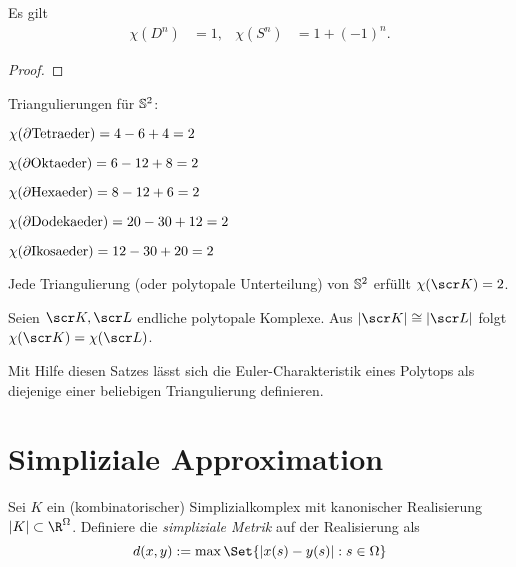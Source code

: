 \begin{prop}
	Es gilt
	\begin{align*}
		\chi(D^n) &= 1, &
		\chi(S^n) &= 1 + (-1)^n.
	\end{align*}
	\begin{proof}
	\end{proof}
\end{prop}

\begin{ex}
	Triangulierungen für $\S^2$:
	\begin{description}
		\item
			$\chi(\boundary \text{Tetraeder}) = 4 - 6 + 4 = 2$
		\item
			$\chi(\boundary \text{Oktaeder}) = 6 - 12 + 8 = 2$
		\item
			$\chi(\boundary \text{Hexaeder}) = 8 - 12 + 6 = 2$
		\item
			$\chi(\boundary \text{Dodekaeder}) = 20 - 30 + 12= 2$
		\item
			$\chi(\boundary \text{Ikosaeder}) = 12 - 30 + 20= 2$
	\end{description}
\end{ex}

\begin{st}
	Jede Triangulierung (oder polytopale Unterteilung) von $\S^2$ erfüllt $\chi(\scr K) = 2$.
\end{st}

\begin{st}
	Seien $\scr K, \scr L$ endliche polytopale Komplexe.
	Aus $|\scr K| \homeomorphic |\scr L|$ folgt $\chi(\scr K) = \chi(\scr L)$.
	\begin{note}
		Mit Hilfe diesen Satzes lässt sich die Euler-Charakteristik eines Polytops als diejenige einer beliebigen Triangulierung definieren.
	\end{note}
\end{st}


\section{Simpliziale Approximation}


\begin{df}
	Sei $K$ ein (kombinatorischer) Simplizialkomplex mit kanonischer Realisierung $|K| \subset \R^{\Omega}$.
	Definiere die \emph{simpliziale Metrik} auf der Realisierung als
	\[
		d(x,y) :=
		\max \Set{ |x(s) - y(s)| : s \in \Omega }
	\]
\end{df}

